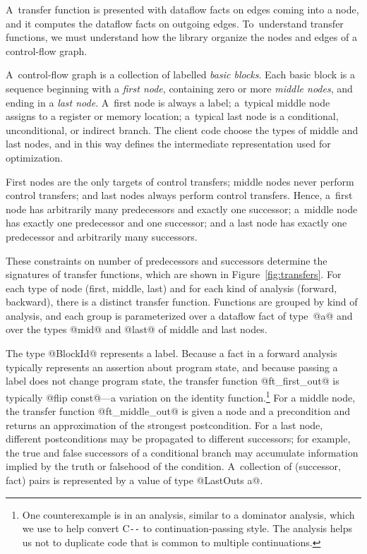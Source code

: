 \documentclass[blockstyle,preprint,nocopyrightspace]{sigplanconf}
\newcommand\PAL{\mbox{C{\texttt{-{}-}}}}
\newcommand\figref[1]{Figure~\ref{fig:#1}}
\begin{document}
A~transfer function is presented with dataflow facts on edges coming
into a node, and it computes the dataflow facts on outgoing edges.
To~understand transfer functions, we must 
understand how the library organize the nodes and edges of a control-flow graph.

A~control-flow graph is a collection of labelled \emph{basic blocks}.
Each basic block is a sequence beginning with a \emph{first node},
containing zero or more \emph{middle nodes},
and ending in a \emph{last node}.
A~first node is always a label;
a~typical middle node assigns to a register or memory
location;
a~typical last node is a conditional, unconditional, or indirect branch.
The client code choose the types of middle and last nodes, and in this
way defines the intermediate
representation used for optimization.




First nodes are the only targets of control transfers;
middle nodes never perform control transfers;
and
last nodes always perform control transfers.
Hence, a~first node has arbitrarily many predecessors and exactly one
successor;
a~middle node has exactly one predecessor and one successor;
and a last node has exactly one predecessor and arbitrarily many
successors. 

These constraints on number of predecessors and successors determine
the signatures of 
transfer functions, 
which are shown in \figref{transfers}.
For each type of node (first, middle, last) and for each kind of
analysis (forward, backward), there is a distinct transfer function.
Functions are grouped by kind of analysis, and each group is
parameterized over a dataflow fact of type~@a@ and over the types
@mid@ and @last@ of middle and last nodes.  


The type @BlockId@ represents a label.
Because a fact in a forward analysis typically represents an assertion
about program state,
 and because passing a label does not change
program state, the transfer function @ft_first_out@ is typically 
@flip const@---a variation on
the
identity function.\footnote
{One counterexample is in an
analysis, similar to a dominator analysis,
which we use to help convert {\PAL} to continuation-passing style.
The  analysis
helps us not to duplicate code that is common to multiple continuations.
}
For a middle node, the transfer function @ft_middle_out@ is given a
node and a precondition and returns an approximation of the strongest
postcondition. 
For a last node, different postconditions may be propagated to
different successors; for example, the true and false successors of a
conditional branch may accumulate information implied by the truth or
falsehood of the condition.
A~collection of (successor, fact) pairs is represented by a value of
type @LastOuts a@.
\end{document}
